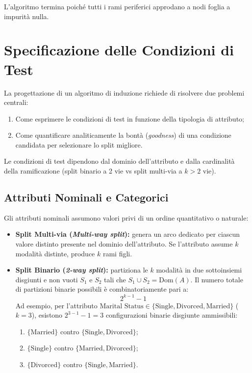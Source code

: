 L'algoritmo termina poiché tutti i rami periferici approdano a nodi foglia a impurità nulla.

\FloatBarrier
\section{Specificazione delle Condizioni di Test}
\label{sec:dm-test-conditions}

La progettazione di un algoritmo di induzione richiede di risolvere due problemi centrali:
\begin{enumerate}
    \item Come esprimere le condizioni di test in funzione della tipologia di attributo;
    \item Come quantificare analiticamente la bontà (\textit{goodness}) di una condizione candidata per selezionare lo split migliore.
\end{enumerate}

Le condizioni di test dipendono dal dominio dell'attributo e dalla cardinalità della ramificazione (split binario a 2 vie vs split multi-via a $k > 2$ vie).

\FloatBarrier
\subsection{Attributi Nominali e Categorici}
\label{subsec:dm-test-nominal}

Gli attributi nominali assumono valori privi di un ordine quantitativo o naturale:
\begin{itemize}
    \item \textbf{Split Multi-via (\textit{Multi-way split}):} genera un arco dedicato per ciascun valore distinto presente nel dominio dell'attributo. Se l'attributo assume $k$ modalità distinte, produce $k$ rami figli.
    \item \textbf{Split Binario (\textit{2-way split}):} partiziona le $k$ modalità in due sottoinsiemi disgiunti e non vuoti $S_1$ e $S_2$ tali che $S_1 \cup S_2 = \text{Dom}(A)$. Il numero totale di partizioni binarie possibili è combinatoriamente pari a:
    \begin{equation}
        2^{k-1} - 1
    \end{equation}
    Ad esempio, per l'attributo $\text{Marital Status} \in \{\text{Single}, \text{Divorced}, \text{Married}\}$ ($k=3$), esistono $2^{3-1} - 1 = 3$ configurazioni binarie disgiunte ammissibili:
    \begin{enumerate}
        \item $\{\text{Married}\}$ contro $\{\text{Single}, \text{Divorced}\}$;
        \item $\{\text{Single}\}$ contro $\{\text{Married}, \text{Divorced}\}$;
        \item $\{\text{Divorced}\}$ contro $\{\text{Single}, \text{Married}\}$.
    \end{enumerate}
\end{itemize}


